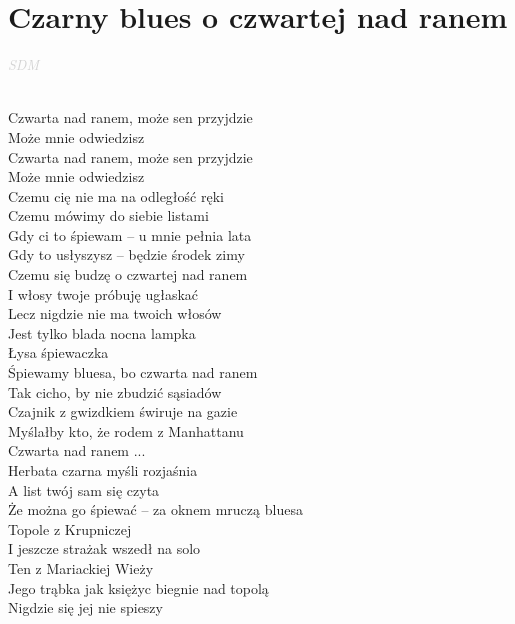 \documentclass[a5paper, 10pt]{book}
\begin{document}
\section{Czarny blues o czwartej nad ranem}\textcolor{lightgray}{\textit{SDM}}\\~\\
\begin{minipage}[t]{0.7\textwidth}

\hspace*{4mm} Czwarta nad ranem, może sen przyjdzie\\
\hspace*{4mm} Może mnie odwiedzisz\\
\hspace*{4mm} Czwarta nad ranem, może sen przyjdzie\\
\hspace*{4mm} Może mnie odwiedzisz\\

Czemu cię nie ma na odległość ręki\\
Czemu mówimy do siebie listami\\
Gdy ci to śpiewam – u mnie pełnia lata\\
Gdy to usłyszysz – będzie środek zimy\\

Czemu się budzę o czwartej nad ranem\\
I włosy twoje próbuję ugłaskać\\
Lecz nigdzie nie ma twoich włosów\\
Jest tylko blada nocna lampka\\
Łysa śpiewaczka\\

Śpiewamy bluesa, bo czwarta nad ranem\\
Tak cicho, by nie zbudzić sąsiadów\\
Czajnik z gwizdkiem świruje na gazie\\
Myślałby kto, że rodem z Manhattanu\\

\hspace*{4mm} Czwarta nad ranem ... \\

Herbata czarna myśli rozjaśnia\\
A list twój sam się czyta\\
Że można go śpiewać – za oknem mruczą bluesa\\
Topole z Krupniczej\\

I jeszcze strażak wszedł na solo\\
Ten z Mariackiej Wieży\\
Jego trąbka jak księżyc biegnie nad topolą\\
Nigdzie się jej nie spieszy\\


\end{minipage}
\end{document}
